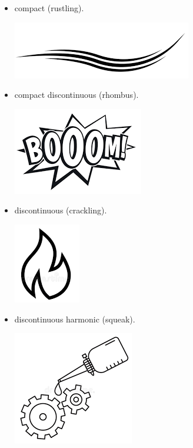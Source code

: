 \begin{enumerate}
\begin{itemize}
\begin{itemize}
\begin{center}
      \end{center}
    \item compact (rustling).
      \begin{center}
      \includegraphics[scale=0.1]{../img/fruscio.png}
      \end{center}
    \item compact discontinuous (rhombus).
      \begin{center}
      \includegraphics[scale=0.2]{../img/rombo.png}
      \end{center}
    \item discontinuous (crackling).
      \begin{center}
      \includegraphics[scale=0.22]{../img/crepitio.png}
      \end{center}
    \item discontinuous harmonic (squeak).
      \begin{center}
      \includegraphics[scale=0.22]{../img/cigolio.png}
      \end{center}

\end{itemize}
\end{itemize}
\end{enumerate}
